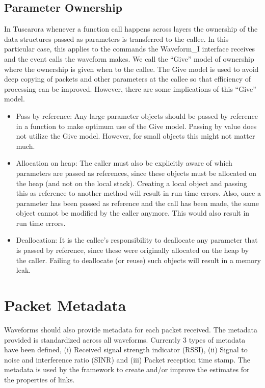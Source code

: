 \subsection {Parameter Ownership}
In Tuscarora whenever a function call happens across layers the ownership of the data structures passed as parameters is transferred to the callee. In this particular case, this applies to the commands the Waveform\_I interface receives and the event calls the waveform makes. We call the “Give” model of ownership where the ownership is given when to the callee. The Give model is used to avoid deep copying of packets and other parameters at the callee so that efficiency of processing can be improved. However, there are some implications of this “Give” model. 
\begin{itemize}
\item Pass by reference: Any large parameter objects should be passed by reference in a function to make optimum use of the Give model. Passing by value does not utilize the Give model. However, for small objects this might not matter much.

\item Allocation on heap: The caller must also be explicitly aware of which parameters are passed as references, since these objects must be allocated on the heap (and not on the local stack). Creating a local object and passing this as reference to another method will result in run time errors. Also, once a parameter has been passed as reference and the call has been made, the same object cannot be modified by the caller anymore. This would also result in run time errors.

\item Deallocation:  It is the callee’s responsibility to deallocate any parameter that is  passed by reference, since these were originally allocated on the heap by the caller. Failing to deallocate (or reuse) such objects will result in a memory leak. 
\end{itemize}



\section{Packet Metadata}

Waveforms should also provide metadata for each packet received.
The metadata provided is standardized across all
waveforms. Currently 3 types of metadata have been defined, (i)
Received signal strength indicator (RSSI), (ii) Signal to noise and
interference ratio (SINR) and (iii) Packet reception time stamp.
The metadata is used by the framework to create and/or improve the
estimates for the properties of links.

